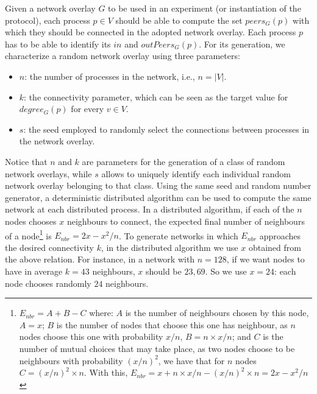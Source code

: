 Given a network overlay $G$ to be used in an experiment (or instantiation of
the protocol), each process $p \in V$ should be able to compute the 
set $peers_G(p)$ with which they should be connected in the adopted network overlay.
Each process $p$ has to be able to identify its $in$ and $outPeers_G(p)$.
%
For its generation, we characterize a random network overlay using three parameters:
\begin{itemize}
	\item  $n$: the number of processes in the network, i.e., $n = |V|$.
    \item  $k$: the connectivity parameter, which can be seen as the target value for
  $degree_G(p)$ for every $v \in V$.
    \item $s$: the seed employed to randomly select the connections between processes
  in the network overlay.
\end{itemize}

Notice that $n$ and $k$ are parameters for the generation of a class of random
network overlays, while $s$ allows to uniquely identify each individual random
network overlay belonging to that class.   
%
Using the same seed and random number generator, a deterministic distributed algorithm can be used to compute the same network at each distributed process. In a distributed algorithm, if each of the $n$ nodes chooses $x$ neighbours to connect, the expected final number of neighbours of a node\footnote{$E_{nbr} = A + B - C$ where: $A$ is the number of neighbours chosen by this node, $A=x$; $B$ is the number of nodes that choose this one has neighbour, as $n$ nodes choose this one with probability $x/n$, $B=n \times x/n$; and $C$ is the number of mutual choices that may take place, as two nodes choose to be neighbours with probability $(x/n)^2$, we have that for $n$ nodes $C = (x/n)^2 \times n$.   With this, $E_{nbr} = x + n \times x/n - (x/n)^2 \times n = 2 x - x^2/n$}
is $E_{nbr} = 2 x - x^2/n$.
%
To generate networks in which $E_{nbr}$ approaches the desired connectivity $k$, %
in the distributed algorithm we use $x$ obtained from the above relation. 
For instance, in a network with $n=128$, if we want nodes to have in average $k = 43$ neighbours, $x$ should be $23,69$. So we use $x = 24$: each node chooses randomly $24$ neighbours. 

